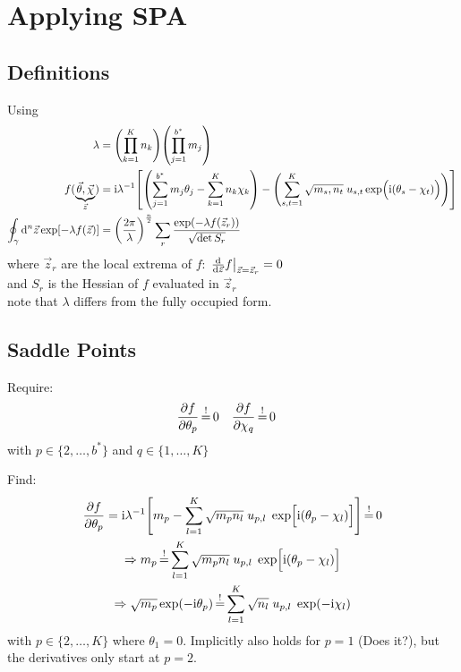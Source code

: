 \documentclass[
	english,
	a4paper,
	fontsize=10pt,
	parskip=half,
	titlepage=true,
	DIV=12,
	final
]{scrreprt}
\newcommand*{\Thus}{\ensuremath{\Rightarrow}\xspace}
\newcommand*{\iunit}{\ensuremath{\mathrm{i}}}
\newcommand*{\equalCond}{  \mathop{=}\limits^!  }
\begin{document}
\section{Applying SPA}
\subsection{Definitions}
Using
\begin{align}
	\lambda
&=
	\qty( \prod_{k=1}^{K}   n_k )
	\qty( \prod_{j=1}^{b^*} m_j )
\label{eqn:DefLambda}
\\
	f(
		\underbrace{ \vec{\theta}, \vec{\chi} }_{\vec{z}}
	)
&=
	\iunit
	\lambda^{-1}
	\qty[
		\qty(
			\sum_{j=1}^{b^*}
				m_j \theta_j   -
			\sum_{k=1}^{K}
				n_k \chi  _k
		)
	-
		\qty(
			\sum_{s,t=1}^{K}
			\sqrt{m_s, n_t} \;
			u_{s,t}
			\exp(\Big.
				\iunit(\theta_s - \chi_t)
			)
		)
	]
\\
	\oint_{\gamma} \dd[n]{\vec{z}}
		\exp[-\lambda f(\vec{z})]
&=
	\qty( \frac
		{2\pi}
		{\lambda}
	)^{\frac{n}{2}}
	\sum_{r}
		\frac
		{\exp(-\lambda f(\vec{z}_r))}
		{\sqrt{\det S_r}}
\label{eqn:Def_SPA}
\end{align}
where $\vec{z}_r$ are the local extrema of $f$: $\eval{\dv{\vec{z}}f}_{\vec{z} = \vec{z}_r} = 0$\\
and $S_r$ is the Hessian of $f$ evaluated in $\vec{z}_r$\\
{\color{red} note that $\lambda$ differs from the fully occupied form.}

\subsection{Saddle Points}
\label{sec:saddles}
Require:
\begin{align}
	\pdv{f}{\theta_p} &\equalCond 0
&
	\pdv{f}{\chi  _q} &\equalCond 0 
\end{align}
with $p \in \{2, \ldots, b^*\}$ and $q \in \{1, \ldots, K\}$

Find:
\begin{gather}
	\pdv{f}{\theta_p}
=
	\iunit \lambda^{-1}
	\qty[
		m_p
		-
		\sum_{l=1}^{K}
			\sqrt{m_p n_l} \; u_{p,l} \; \exp[ \Big. \iunit(\theta_p - \chi_l)]
	]
	\label{eqn:Jacobiantheta}
\equalCond
	0 \\
\Thus
	m_p
\equalCond
	\sum_{l=1}^{K}
		\sqrt{m_p n_l} \; u_{p,l} \; \exp[ \Big. \iunit(\theta_p - \chi_l) ] \\
\Thus
	\sqrt{m_p} \exp(-\iunit \theta_p)
\equalCond
	\sum_{l=1}^{K} \sqrt{n_l} \; u_{p,l} \; \exp(-\iunit\chi_l)
	\label{eqn:FourierLinkForward}
\end{gather}
with $p \in \{2, \ldots, K\}$ where $\theta_1 = 0$. Implicitly also holds for $p=1$ {\color{red}(Does it?)}, but the derivatives only start at $p=2$.
\end{document}
